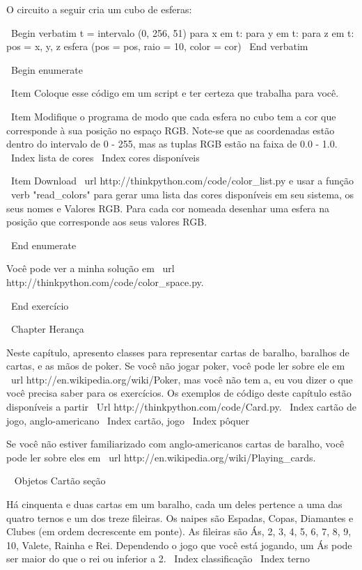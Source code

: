 \documentclass[10pt]{book}
\begin{document}
{{{{{{{{{{{{{{O circuito a seguir cria um cubo de esferas:

\ Begin {verbatim}
t = intervalo (0, 256, 51)
para x em t:
    para y em t:
        para z em t:
            pos = x, y, z
            esfera (pos = pos, raio = 10, color = cor)
\ End {verbatim}

\ Begin {enumerate}

\ Item Coloque esse código em um script e ter certeza que trabalha para
você.

\ Item Modifique o programa de modo que cada esfera no cubo
tem a cor que corresponde à sua posição no espaço RGB.
Note-se que as coordenadas estão dentro do intervalo de 0 - 255, mas
as tuplas RGB estão na faixa de 0.0 - 1.0.
\ Index {lista de cores}
\ Index {cores disponíveis}

\ Item Download \ url {http://thinkpython.com/code/color_list.py}
e usar a função \ verb "read_colors" para gerar uma lista
das cores disponíveis em seu sistema, os seus nomes e
Valores RGB. Para cada cor nomeada desenhar uma esfera na
posição que corresponde aos seus valores RGB.



\ End {enumerate}

Você pode ver a minha solução em \ url {http://thinkpython.com/code/color_space.py}.

\ End {} exercício


\ Chapter {} Herança

Neste capítulo, apresento classes para representar cartas de baralho,
baralhos de cartas, e as mãos de poker. Se você não jogar poker, você pode
ler sobre ele em \ url {http://en.wikipedia.org/wiki/Poker}, mas você não tem
a, eu vou dizer o que você precisa saber para os exercícios.
Os exemplos de código deste capítulo estão disponíveis a partir
\ Url {http://thinkpython.com/code/Card.py}.
\ Index {cartão de jogo, anglo-americano}
\ Index {cartão, jogo}
\ Index {} pôquer

Se você não estiver familiarizado com anglo-americanos cartas de baralho,
você pode ler sobre eles em \ url {http://en.wikipedia.org/wiki/Playing_cards}.


\ {} Objetos Cartão seção

Há cinquenta e duas cartas em um baralho, cada um deles pertence a uma das
quatro ternos e um dos treze fileiras. Os naipes são Espadas, Copas,
Diamantes e Clubes (em ordem decrescente em ponte). As fileiras são
Ás, 2, 3, 4, 5, 6, 7, 8, 9, 10, Valete, Rainha e Rei. Dependendo
o jogo que você está jogando, um Ás pode ser maior do que o rei
ou inferior a 2.
\ Index {} classificação
\ Index {terno}

}}}}}}}}}}}}}}
\end{document}
